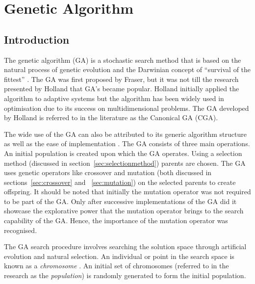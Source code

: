 \section{Genetic Algorithm}
\label{sec:geneticalgorithm}
\subsection{Introduction}
The genetic algorithm (GA) is a stochastic search method that is based on the natural process of genetic evolution and the Darwinian concept of ``survival of the fittest'' \cite{DistributedHierarchicalGA,AcceleratingGA,AdaptiveSAGA,FamilyGA}. The \gls{GA} was first proposed by Fraser, but it was not till the research presented by Holland that \gls{GA}'s became popular\cite{CompuIntelligenceIntro}. Holland initially applied the algorithm to adaptive systems but the algorithm has been widely used in optimisation due to its success on multidimensional problems\cite{ParallelGASA,DistributedHierarchicalGA,FamilyGA}. The \gls{GA} developed by Holland is referred to in the literature as the Canonical \gls{GA} (CGA)\cite{CompuIntelligenceIntro}.

The wide use of the \gls{GA} can also be attributed to its generic algorithm structure as well as the ease of implementation \cite{FamilyGA,AdaptiveSAGA}. The \gls{GA} consists of three main operations. An initial population is created upon which the GA operates. Using a selection method (discussed in section~\ref{sec:selectionmethod}) parents are chosen. The \gls{GA} uses genetic operators like crossover and mutation (both discussed in sections~\ref{sec:crossover} and ~\ref{sec:mutation}) on the selected parents to create offspring\cite{GAGoldberg}. It should be noted that initially the mutation operator was not required to be part of the \gls{GA}. Only after successive implementations of the \gls{GA} did it showcase the explorative power that the mutation operator brings to the search capability of the \gls{GA}. Hence, the importance of the mutation operator was recognised\cite{CompuIntelligenceIntro}. 


The \gls{GA} search procedure involves searching the solution space through artificial evolution and natural selection\cite{FamilyGA,MultiPopGA,HybridIntelliGA}. An individual or point in the search space is known as a \emph{chromosome} \cite{HumanPassiveGA}. An initial set of chromosomes (referred to in the research as the \emph{population}) is randomly generated to form the initial population\cite{FamilyGA,HybridIntelliGA,AcceleratingGA,MultiPopGA}. 

